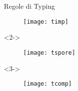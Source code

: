 \begin{frame}{Regole di Typing}
	\begin{figure}
		\centering\texttt{[image: timp]}
	\end{figure}
	
	\begin{onlyenv}<2->
		\begin{figure}
			\centering\texttt{[image: tspore]}
		\end{figure}
	\end{onlyenv}
	
	\begin{onlyenv}<3->
		\begin{figure}
			\centering\texttt{[image: tcomp]}
		\end{figure}
	\end{onlyenv}
\end{frame}